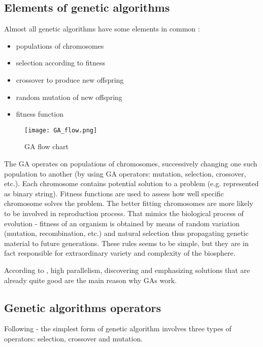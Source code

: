 \subsection{Elements of genetic algorithms}

Almost all genetic algorithms have some elements in common \cite{Mitchell01}:
\begin{itemize}
  \item populations of chromosomes
  \item selection according to fitness
  \item crossover to produce new offspring
  \item random mutation of new offspring
  \item fitness function
\end{itemize}

\begin{figure}[ht]
  \begin{center}
    \texttt{[image: GA\_flow.png]}
  \end{center}
  \caption{GA flow chart \cite{Haupt:2004:PGA:1007746}}
\end{figure}

The GA operates on populations of chromosomes, successively changing one such population to another (by using GA operators: mutation, selection, crossover, etc.). 
Each chromosome contains potential solution to a problem (e.g. represented as binary string). 
Fitness functions are used to assess how well specific chromosome solves the problem.
The better fitting chromosomes are more likely to be involved in reproduction process.
That mimics the biological process of evolution - fitness of an organism is obtained by means of random variation (mutation, recombination, etc.) and natural selection
thus propagating genetic material to future generations.
These rules seems to be simple, but they are in fact responsible for extraordinary variety and complexity of the biosphere.
\cite{Mitchell01} 
 
According to \cite{Mitchell01} , high parallelism, discovering and emphasizing solutions that are already quite good are the main reason why GAs work.  
 

\subsection{Genetic algorithms operators}

Following \cite{Mitchell01} - the simplest form of genetic algorithm involves three types of operators: selection, crossover and mutation. 

